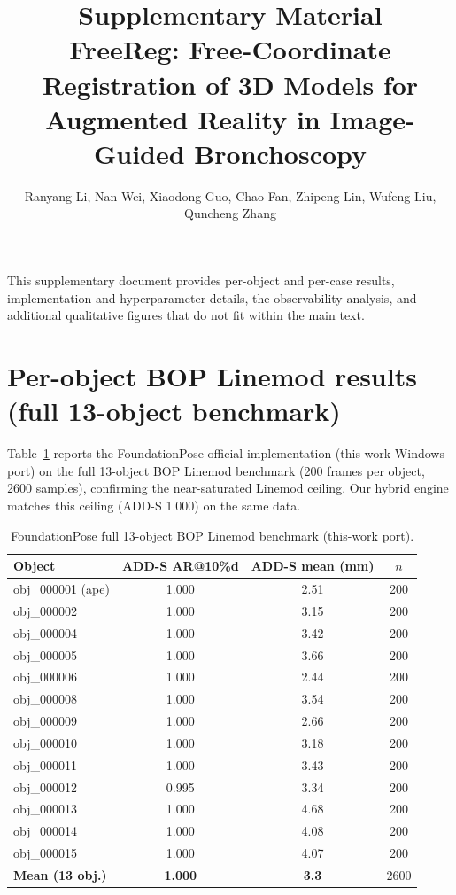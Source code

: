 \documentclass[10pt]{article}
\title{Supplementary Material\\[0.3em]
\large FreeReg: Free-Coordinate Registration of 3D Models for Augmented Reality in Image-Guided Bronchoscopy}
\author{Ranyang Li, Nan Wei, Xiaodong Guo, Chao Fan, Zhipeng Lin, Wufeng Liu, Quncheng Zhang}
\date{}
\begin{document}
\maketitle

This supplementary document provides per-object and per-case results,
implementation and hyperparameter details, the observability analysis, and
additional qualitative figures that do not fit within the main text.

\section{Per-object BOP Linemod results (full 13-object benchmark)}
Table~\ref{tab:perobj} reports the FoundationPose official implementation
(this-work Windows port) on the full 13-object BOP Linemod benchmark (200
frames per object, 2600 samples), confirming the near-saturated Linemod
ceiling. Our hybrid engine matches this ceiling (ADD-S 1.000) on the same data.

\begin{table}[h]
\centering
\caption{FoundationPose full 13-object BOP Linemod benchmark (this-work port).}
\label{tab:perobj}
\begin{tabular}{lccc}
\toprule
Object & ADD-S AR@10\%d & ADD-S mean (mm) & $n$ \\
\midrule
obj\_000001 (ape) & 1.000 & 2.51 & 200 \\
obj\_000002 & 1.000 & 3.15 & 200 \\
obj\_000004 & 1.000 & 3.42 & 200 \\
obj\_000005 & 1.000 & 3.66 & 200 \\
obj\_000006 & 1.000 & 2.44 & 200 \\
obj\_000008 & 1.000 & 3.54 & 200 \\
obj\_000009 & 1.000 & 2.66 & 200 \\
obj\_000010 & 1.000 & 3.18 & 200 \\
obj\_000011 & 1.000 & 3.43 & 200 \\
obj\_000012 & 0.995 & 3.34 & 200 \\
obj\_000013 & 1.000 & 4.68 & 200 \\
obj\_000014 & 1.000 & 4.08 & 200 \\
obj\_000015 & 1.000 & 4.07 & 200 \\
\midrule
\textbf{Mean (13 obj.)} & \textbf{1.000} & \textbf{3.3} & 2600 \\
\bottomrule
\end{tabular}
\end{table}
\end{document}

